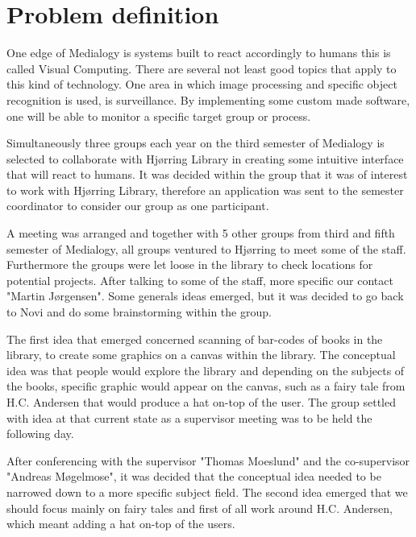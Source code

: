\chapter{Problem definition}
One edge of Medialogy is systems built to react accordingly to humans this is called Visual Computing. There are several not least good topics that apply to this kind of technology. One area in which image processing and specific object recognition is used, is surveillance. By implementing some custom made software, one will be able to monitor a specific target group or process. 

Simultaneously three groups each year on the third semester of Medialogy is selected to collaborate with Hjørring Library in creating some intuitive interface that will react to humans. It was decided within the group that it was of interest to work with Hjørring Library, therefore an application was sent to the semester coordinator to consider our group as one participant.

A meeting was arranged and together with 5 other groups from third and fifth semester of Medialogy, all groups ventured to Hjørring to meet some of the staff. Furthermore the groups were let loose in the library to check locations for potential projects. After talking to some of the staff, more specific our contact "Martin Jørgensen". Some generals ideas emerged, but it was decided to go back to Novi and do some brainstorming within the group.

The first idea that emerged concerned scanning of bar-codes of books in the library, to create some graphics on a canvas within the library. The conceptual idea was that people would explore the library and depending on the subjects of the books, specific graphic would appear on the canvas, such as a fairy tale from H.C. Andersen that would produce a hat on-top of the user. The group settled with idea at that current state as a supervisor meeting was to be held the following day.

After conferencing with the supervisor "Thomas Moeslund" and the co-supervisor "Andreas Møgelmose", it was decided that the conceptual idea needed to be narrowed down to a more specific subject field. The second idea emerged that we should focus mainly on fairy tales and first of all work around H.C. Andersen, which meant adding a hat on-top of the users.

